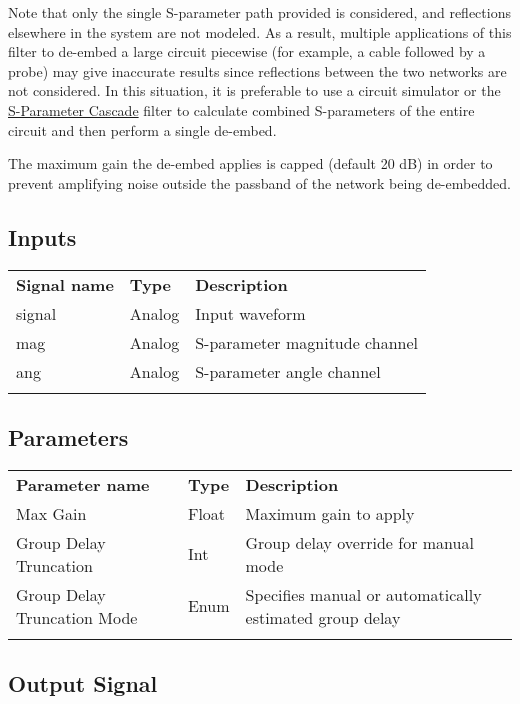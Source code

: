 Note that only the single S-parameter path provided is considered, and reflections elsewhere in the system are not
modeled. As a result, multiple applications of this filter to de-embed a large circuit piecewise (for example, a cable
followed by a probe) may give inaccurate results since reflections between the two networks are not considered. In this
situation, it is preferable to use a circuit simulator or the \hyperref[filter:sparamcascade]{S-Parameter Cascade}
filter to calculate combined S-parameters of the entire circuit and then perform a single de-embed.

The maximum gain the de-embed applies is capped (default 20 dB) in order to prevent amplifying noise outside the
passband of the network being de-embedded.

\subsection{Inputs}

\begin{tabularx}{16cm}{llX}
\thickhline
\textbf{Signal name} & \textbf{Type} & \textbf{Description} \\
\thickhline
signal & Analog & Input waveform \\
\thinhline
mag & Analog & S-parameter magnitude channel \\
\thinhline
ang & Analog & S-parameter angle channel \\
\thickhline
\end{tabularx}

\subsection{Parameters}

\begin{tabularx}{16cm}{llX}
\thickhline
\textbf{Parameter name} & \textbf{Type} & \textbf{Description} \\
\thickhline
Max Gain & Float & Maximum gain to apply\\
\thinhline
Group Delay Truncation & Int & Group delay override for manual mode\\
\thinhline
Group Delay Truncation Mode & Enum & Specifies manual or automatically estimated group delay\\
\thickhline
\end{tabularx}

\subsection{Output Signal}

